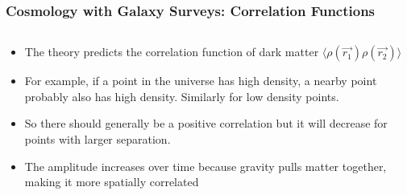\documentclass{beamer}
\begin{document}
\frame
{

    \frametitle{Cosmology with Galaxy Surveys: Correlation Functions}


    \begin{columns}
        \begin{column}{0.5\textwidth}
            \begin{itemize}

                \item The theory predicts the correlation function of
                    dark matter {\color{gold} $\langle \rho(\vec{r_1}) \rho(\vec{r_2})
                    \rangle$ }

                \item For example, if a point in the universe has high density, a nearby
                    point probably also has high density. Similarly
                    for low density points.
                    
                \item So there should generally
                    be a positive correlation but it will decrease
                    for  points with larger separation.
                    
                \item The amplitude increases over time because gravity pulls
                    matter together, making it more spatially correlated


            \end{itemize}


\end{column}
\end{columns}}
\end{document}
